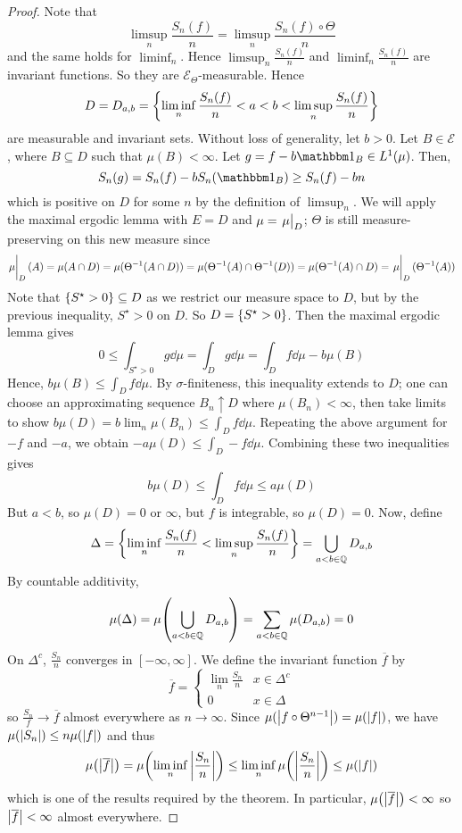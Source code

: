 \begin{proof}
    Note that
    \[ \limsup_n \frac{S_n(f)}{n} =  \limsup_n \frac{S_n(f) \circ \Theta}{n} \]
    and the same holds for \( \liminf_n \).
    Hence \( \limsup_n \frac{S_n(f)}{n} \) and \( \liminf_n \frac{S_n(f)}{n} \) are invariant functions.
    So they are \( \mathcal E_\Theta \)-measurable.
    Hence
    \[ D = D_{a,b} = \qty{\liminf_n \frac{S_n(f)}{n} < a < b < \limsup_n \frac{S_n(f)}{n}} \]
    are measurable and invariant sets.
    Without loss of generality, let \( b > 0 \).
    Let \( B \in \mathcal E \), where \( B \subseteq D \) such that \( \mu(B) < \infty \).
    Let \( g = f - b\mathbbm 1_B \in L^1(\mu) \).
    Then,
    \[ S_n(g) = S_n(f) - bS_n(\mathbbm 1_B) \geq S_n(f) - bn \]
    which is positive on \( D \) for some \( n \) by the definition of \( \limsup_n \).
    We will apply the maximal ergodic lemma with \( E = D \) and \( \mu = \eval{\mu}_D \); \( \Theta \) is still measure-preserving on this new measure since
    \[ \eval{\mu}_D(A) = \mu(A \cap D) = \mu(\Theta^{-1}(A \cap D)) = \mu(\Theta^{-1}(A) \cap \Theta^{-1}(D)) = \mu(\Theta^{-1}(A) \cap D) = \eval{\mu}_D(\Theta^{-1}(A)) \]
    Note that \( \qty{S^\star > 0} \subseteq D \) as we restrict our measure space to \( D \), but by the previous inequality, \( S^\star > 0 \) on \( D \).
    So \( D = \qty{S^\star > 0} \).
    Then the maximal ergodic lemma gives
    \[ 0 \leq \int_{S^\star > 0} g \dd{\mu} = \int_D g \dd{\mu} = \int_D f \dd{\mu} - b \mu(B) \]
    Hence, \( b \mu(B) \leq \int_D f \dd{\mu} \).
    By \( \sigma \)-finiteness, this inequality extends to \( D \); one can choose an approximating sequence \( B_n \uparrow D \) where \( \mu(B_n) < \infty \), then take limits to show \( b\mu(D) = b \lim_n \mu(B_n) \leq \int_D f \dd{\mu} \).
    Repeating the above argument for \( -f \) and \( -a \), we obtain \( -a\mu(D) \leq \int_D -f \dd{\mu} \).
    Combining these two inequalities gives
    \[ b\mu(D) \leq \int_D f \dd{\mu} \leq a\mu(D) \]
    But \( a < b \), so \( \mu(D) = 0 \) or \( \infty \), but \( f \) is integrable, so \( \mu(D) = 0 \).
    Now, define
    \[ \Delta = \qty{\liminf_n \frac{S_n(f)}{n} < \limsup_n \frac{S_n(f)}{n}}  = \bigcup_{a < b \in \mathbb Q} D_{a,b} \]
    By countable additivity,
    \[ \mu(\Delta) = \mu\qty(\bigcup_{a < b \in \mathbb Q} D_{a,b}) = \sum_{a < b \in \mathbb Q} \mu(D_{a,b}) = 0 \]
    On \( \Delta^c \), \( \frac{S_n}{n} \) converges in \( [-\infty, \infty] \).
    We define the invariant function \( \overline f \) by
    \[ \overline f = \begin{cases}
        \lim_n \frac{S_n}{n} & x \in \Delta^c \\
        0 & x \in \Delta
    \end{cases} \]
    so \( \frac{S_n}{f} \to \overline f \) almost everywhere as \( n \to \infty \).
    Since \( \mu(\abs{f \circ \Theta^{n-1}}) = \mu(\abs{f}) \), we have \( \mu(\abs{S_n}) \leq n \mu(\abs{f}) \) and thus
    \[ \mu\qty(\abs{\overline f}) = \mu\qty(\liminf_n \abs{\frac{S_n}{n}}) \leq \liminf_n \mu\qty(\abs{\frac{S_n}{n}}) \leq \mu(\abs{f}) \]
    which is one of the results required by the theorem.
    In particular, \( \mu\qty(\abs{\overline f}) < \infty \) so \( \abs{\overline f} < \infty \) almost everywhere.
\end{proof}
